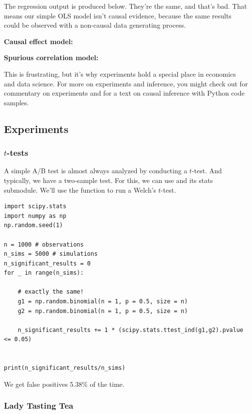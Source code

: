 The regression output is produced below. They're the same, and that's bad. That means our simple OLS model isn't causal evidence, because the same results could be observed with a non-causal data generating process. 

\textbf{Causal effect model:}
\begin{footnotesize}

\end{footnotesize}

\textbf{Spurious correlation model:}
\begin{footnotesize}

\end{footnotesize}

This is frustrating, but it's why experiments hold a special place in economics and data science. For more on experiments and inference, you might check out \cite{luca2020want} for commentary on experiments and \cite{cunningham2021causal} for a text on causal inference with Python code samples. 

\subsection{Experiments}


\subsubsection{$t$-tests}
A simple A/B test is almost always analyzed by conducting a $t$-test. And typically, we have a two-sample test. For this, we can use  and its stats submodule. 
We'll use the  function to run a Welch's $t$-test.


\begin{lstlisting}
import scipy.stats
import numpy as np
np.random.seed(1)

n = 1000 # observations
n_sims = 5000 # simulations
n_significant_results = 0
for _ in range(n_sims):
    
    # exactly the same!
    g1 = np.random.binomial(n = 1, p = 0.5, size = n)
    g2 = np.random.binomial(n = 1, p = 0.5, size = n)
    
    n_significant_results += 1 * (scipy.stats.ttest_ind(g1,g2).pvalue <= 0.05)
    
    
print(n_significant_results/n_sims)
\end{lstlisting}

We get false positives 5.38\% of the time. 


\subsubsection{Lady Tasting Tea}

